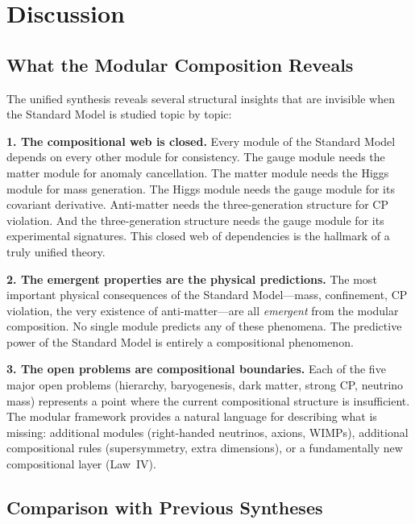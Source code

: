 \documentclass[12pt]{article}
\theoremstyle{definition}
\theoremstyle{remark}
\begin{document}
\section{Discussion}
\label{sec:discussion}

\subsection{What the Modular Composition Reveals}

The unified synthesis reveals several structural insights that are invisible when the Standard Model is studied topic by topic:

\textbf{1. The compositional web is closed.} Every module of the Standard Model depends on every other module for consistency. The gauge module needs the matter module for anomaly cancellation. The matter module needs the Higgs module for mass generation. The Higgs module needs the gauge module for its covariant derivative. Anti-matter needs the three-generation structure for CP violation. And the three-generation structure needs the gauge module for its experimental signatures. This closed web of dependencies is the hallmark of a truly unified theory.

\textbf{2. The emergent properties are the physical predictions.} The most important physical consequences of the Standard Model---mass, confinement, CP violation, the very existence of anti-matter---are all \emph{emergent} from the modular composition. No single module predicts any of these phenomena. The predictive power of the Standard Model is entirely a compositional phenomenon.

\textbf{3. The open problems are compositional boundaries.} Each of the five major open problems (hierarchy, baryogenesis, dark matter, strong CP, neutrino mass) represents a point where the current compositional structure is insufficient. The modular framework provides a natural language for describing what is missing: additional modules (right-handed neutrinos, axions, WIMPs), additional compositional rules (supersymmetry, extra dimensions), or a fundamentally new compositional layer (Law~IV).

\subsection{Comparison with Previous Syntheses}
\end{document}
